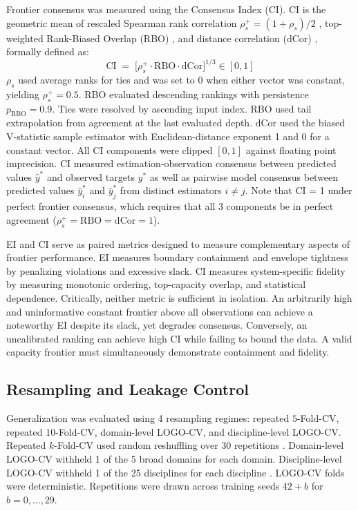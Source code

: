 \documentclass{article}
\begin{document}
Frontier consensus was measured using the Consensus Index (CI). CI is the geometric mean of rescaled Spearman rank correlation $\rho_s^{+} = (1 + \rho_s)/2$ \citep{ref42}, top-weighted Rank-Biased Overlap (RBO) \citep{ref43}, and distance correlation ($\mathrm{dCor}$) \citep{ref44}, formally defined as:
\begin{equation}
\mathrm{CI} \;=\;
\Big[
\rho_s^{+} \cdot \mathrm{RBO} \cdot \mathrm{dCor}
\Big]^{1/3} \in [0, 1]
\label{eq:ci}
\end{equation}
$\rho_s$ used average ranks for ties and was set to 0 when either vector was constant, yielding $\rho_s^{+} = 0.5$. RBO evaluated descending rankings with persistence $p_{\mathrm{RBO}} = 0.9$. Ties were resolved by ascending input index. RBO used tail extrapolation from agreement at the last evaluated depth. $\mathrm{dCor}$ used the biased V-statistic sample estimator with Euclidean-distance exponent 1 and 0 for a constant vector. All CI components were clipped $[0, 1]$ against floating point imprecision. CI measured estimation-observation consensus between predicted values $\widehat{y}^*$ and observed targets $y^*$ as well as pairwise model consensus between predicted values $\widehat{y}^*_i$ and $\widehat{y}^*_j$ from distinct estimators $i \neq j$. Note that CI = 1 under perfect frontier consensus, which requires that all 3 components be in perfect agreement ($\rho_s^{+} = \mathrm{RBO} = \mathrm{dCor} = 1$).

EI and CI serve as paired metrics designed to measure complementary aspects of frontier performance. EI measures boundary containment and envelope tightness by penalizing violations and excessive slack. CI measures system-specific fidelity by measuring monotonic ordering, top-capacity overlap, and statistical dependence. Critically, neither metric is sufficient in isolation. An arbitrarily high and uninformative constant frontier above all observations can achieve a noteworthy EI despite its slack, yet degrades consensus. Conversely, an uncalibrated ranking can achieve high CI while failing to bound the data. A valid capacity frontier must simultaneously demonstrate containment and fidelity.

\subsection*{Resampling and Leakage Control}
\label{sec:resampling}
Generalization was evaluated using 4 resampling regimes: repeated $5$-Fold-CV, repeated $10$-Fold-CV, domain-level LOGO-CV, and discipline-level LOGO-CV. Repeated $k$-Fold-CV used random reshuffling over 30 repetitions \citep{ref73}. Domain-level LOGO-CV withheld 1 of the 5 broad domains for each domain. Discipline-level LOGO-CV withheld 1 of the 25 disciplines for each discipline \citep{ref68,ref69,ref70,ref74,ref107}. LOGO-CV folds were deterministic. Repetitions were drawn across training seeds $42 + b$ for $b = 0, \ldots, 29$.
\end{document}
